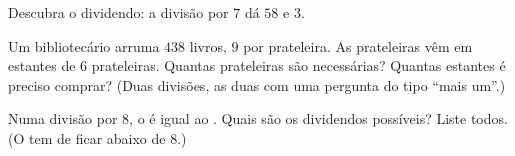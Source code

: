 \begin{exercise}[$\star$]\label{exo:g4:division:9}
Descubra o dividendo: a divisão por $7$ dá  $58$ e 
$3$.
\end{exercise}

\begin{exercise}[$\star\star$]\label{exo:g4:division:10}
Um bibliotecário arruma $438$ livros, $9$ por prateleira. As
prateleiras vêm em estantes de $6$ prateleiras. Quantas prateleiras
são necessárias? Quantas estantes é preciso comprar? (Duas divisões,
as duas com uma pergunta do tipo ``mais um''.)
\end{exercise}

\begin{exercise}[$\star\star$]\label{exo:g4:division:11}
Numa divisão por $8$, o  é igual ao . Quais são os
dividendos possíveis? Liste todos. (O  tem de ficar abaixo de
$8$.)
\end{exercise}

